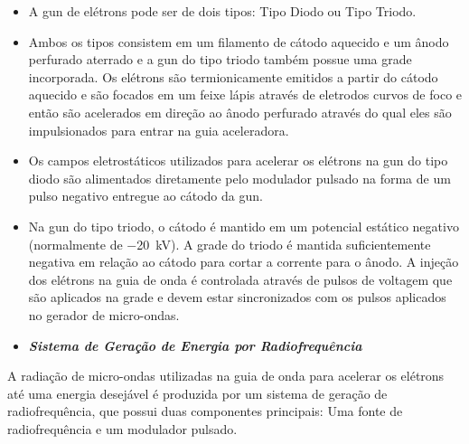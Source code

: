 \documentclass[11pt,a4paper]{article}
\begin{document}
                    \begin{itemize}
                        \item A gun de elétrons pode ser de dois tipos: Tipo Diodo ou Tipo Triodo.
                        
                        \item Ambos os tipos consistem em um filamento de cátodo aquecido e um ânodo perfurado aterrado e a gun do tipo triodo também possue uma grade incorporada. Os elétrons são  termionicamente emitidos a partir do cátodo aquecido e são focados em um feixe lápis através de eletrodos curvos de foco e então são acelerados em direção ao ânodo perfurado  através do qual eles são impulsionados para entrar na guia aceleradora.
                        
                        \item Os campos eletrostáticos utilizados para acelerar os elétrons na gun do tipo diodo são alimentados diretamente pelo modulador pulsado na forma de um pulso negativo entregue ao cátodo da gun.
                        
                        \item Na gun do tipo triodo, o cátodo é mantido em um potencial estático negativo (normalmente de \qty{-20}{kV}). A grade do triodo é mantida suficientemente negativa em relação ao cátodo para cortar a corrente para o ânodo. A injeção dos elétrons na guia de onda é controlada através de pulsos de voltagem que são aplicados na grade e devem estar sincronizados com os pulsos aplicados no gerador de micro-ondas.
                    \end{itemize}
                    
            
                \begin{itemize}
                    \item \textbf{\textit{\textcolor{CarnationPink}{Sistema de Geração de Energia por Radiofrequência}}}
                \end{itemize}

                    A radiação de micro-ondas utilizadas na guia de onda para acelerar os elétrons até uma energia desejável é produzida por um sistema de geração de radiofrequência, que possui duas componentes principais: Uma fonte de radiofrequência e um modulador pulsado. 
\end{document}
